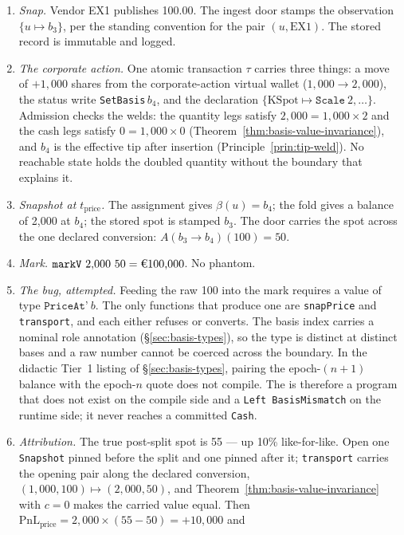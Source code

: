 \begin{enumerate}[nosep]
\item \emph{Snap.} Vendor EX1 publishes 100.00. The ingest door stamps the observation
$\{u\mapsto b_3\}$, per the standing convention for the pair $(u,\mathrm{EX1})$. The
stored record is immutable and logged.
\item \emph{The corporate action.} One atomic transaction $\tau$ carries three things:
a move of $+1{,}000$ shares from the corporate-action virtual wallet
($1{,}000\to2{,}000$), the status write \texttt{SetBasis}\,$b_4$, and the declaration
$\{\mathrm{KSpot}\mapsto\texttt{Scale}\ 2,\dots\}$. Admission checks the welds:
the quantity legs satisfy $2{,}000=1{,}000\times2$ and the cash legs satisfy
$0=1{,}000\times0$ (Theorem~\ref{thm:basis-value-invariance}), and $b_4$ is the
effective tip after insertion (Principle~\ref{prin:tip-weld}). No reachable state
holds the doubled quantity without the boundary that explains it.
\item \emph{Snapshot at $t_{\mathrm{price}}$.} The assignment gives $\beta(u)=b_4$; the
fold gives a balance of 2{,}000 at $b_4$; the stored spot is stamped $b_3$. The door
carries the spot across the one declared conversion: $A(b_3\to b_4)(100)=50$.
\item \emph{Mark.} $\texttt{markV}\ 2{,}000\ 50=\EUR{100{,}000}$. No phantom.
\item \emph{The bug, attempted.} Feeding the raw 100 into the mark requires a value of
type $\texttt{PriceAt'}\ b$. The only functions that produce one are \texttt{snapPrice}
and \texttt{transport}, and each either refuses or converts. The basis index
carries a nominal role annotation (\S\ref{sec:basis-types}), so the type is
distinct at distinct bases and a raw number cannot be coerced across the
boundary. In the didactic Tier~1 listing of \S\ref{sec:basis-types}, pairing
the epoch-$(n{+}1)$ balance with the epoch-$n$ quote does not compile. The 
is therefore a program that does not exist on the compile side and a
\texttt{Left BasisMismatch} on the runtime side; it never reaches a committed
\texttt{Cash}.
\item \emph{Attribution.} The true post-split spot is 55 --- up 10\% like-for-like.
Open one \texttt{Snapshot} pinned before the split and one pinned after it;
\texttt{transport} carries the opening pair along the declared conversion,
$(1{,}000,100)\mapsto(2{,}000,50)$, and Theorem~\ref{thm:basis-value-invariance} with
$c=0$ makes the carried value equal. Then
$\mathrm{PnL}_{\text{price}}=2{,}000\times(55-50)=+10{,}000$ and

\end{enumerate}
